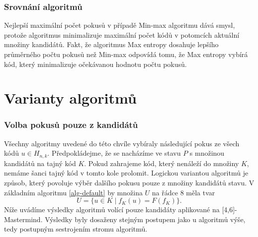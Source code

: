 


\subsubsection{Srovnání algoritmů}
Nejlepší maximální počet pokusů v případě Min-max algoritmu dává smysl, protože algoritmus minimalizuje maximální počet kódů v potomcích aktuální množiny kandidátů. Fakt, že algoritmus Max entropy dosahuje lepšího průměrného počtu pokusů než Min-max odpovídá tomu, že Max entropy vybírá kód, který minimalizuje očekávanou hodnotu počtu pokusů. 



\section{Varianty algoritmů}
\subsubsection{Volba pokusů pouze z kandidátů}
Všechny algoritmy uvedené do této chvíle vybíraly následující pokus ze všech kódů $u\in H_{n,k}$. Předpokládejme, že se nacházíme ve stavu $P$ s množinou kandidátů na tajný kód $K$. Pokud zahrajeme kód, který nenáleží do množiny $K$, nemáme šanci tajný kód v tomto kole prolomit. Logickou variantou algoritmů je způsob, který povoluje výběr dalšího pokusu pouze z množiny kandidátů stavu. V základním algoritmu \ref{alg-default} by množina $U$ na řádce $8$ měla tvar
\[U = \{u \in K \mid f_K(u) = F(f_K)\}.\]
Níže uvádíme výsledky algoritmů volící pouze kandidáty aplikované na [4,6]-Mastermind. Výsledky byly dosaženy stejným postupem jako u algoritmů výše, tedy postupným sestrojením stromu algoritmů. 

